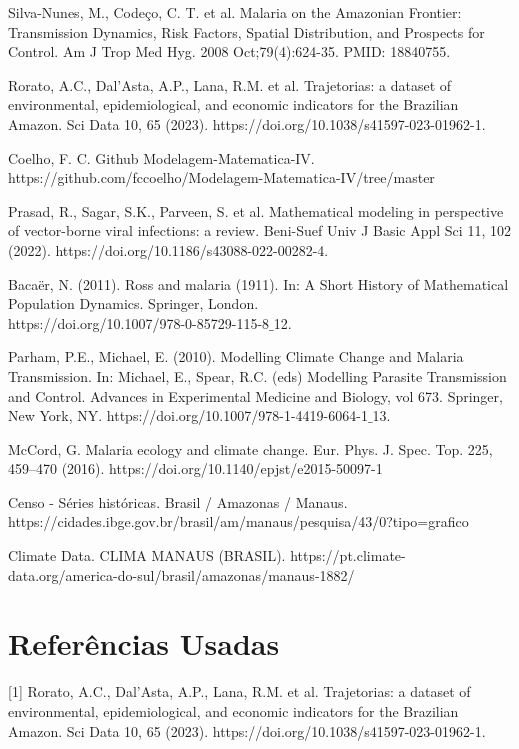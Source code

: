 \documentclass[12pt]{article}
\begin{document}
\noindent [3] Silva-Nunes, M., Codeço, C. T. et al. Malaria on the Amazonian Frontier: Transmission Dynamics, Risk Factors, Spatial Distribution, and Prospects for Control. Am J Trop Med Hyg. 2008 Oct;79(4):624-35. PMID: 18840755.

\noindent [4] Rorato, A.C., Dal’Asta, A.P., Lana, R.M. et al. Trajetorias: a dataset of environmental, epidemiological, and economic indicators for the Brazilian Amazon. Sci Data 10, 65 (2023). https://doi.org/10.1038/s41597-023-01962-1.

\noindent [5] Coelho, F. C. Github Modelagem-Matematica-IV. \\ https://github.com/fccoelho/Modelagem-Matematica-IV/tree/master

\noindent [6] Prasad, R., Sagar, S.K., Parveen, S. et al. Mathematical modeling in perspective of vector-borne viral infections: a review. Beni-Suef Univ J Basic Appl Sci 11, 102 (2022). https://doi.org/10.1186/s43088-022-00282-4.

\noindent [7] Bacaër, N. (2011). Ross and malaria (1911). In: A Short History of Mathematical Population Dynamics. Springer, London. \\ https://doi.org/10.1007/978-0-85729-115-8$\_$12.

\noindent [8] Parham, P.E., Michael, E. (2010). Modelling Climate Change and Malaria Transmission. In: Michael, E., Spear, R.C. (eds) Modelling Parasite Transmission and Control. Advances in Experimental Medicine and Biology, vol 673. Springer, New York, NY. https://doi.org/10.1007/978-1-4419-6064-1$\_$13.

\noindent [9] McCord, G. Malaria ecology and climate change. Eur. Phys. J. Spec. Top. 225, 459–470 (2016). https://doi.org/10.1140/epjst/e2015-50097-1

\noindent [10] Censo - Séries históricas. Brasil / Amazonas / Manaus. 
\\https://cidades.ibge.gov.br/brasil/am/manaus/pesquisa/43/0?tipo=grafico

\noindent [11] Climate Data. CLIMA MANAUS (BRASIL). https://pt.climate-data.org/america-do-sul/brasil/amazonas/manaus-1882/

\newpage
\section{Referências Usadas}

[1] Rorato, A.C., Dal’Asta, A.P., Lana, R.M. et al. Trajetorias: a dataset of environmental, epidemiological, and economic indicators for the Brazilian Amazon. Sci Data 10, 65 (2023). https://doi.org/10.1038/s41597-023-01962-1.
\end{document}
